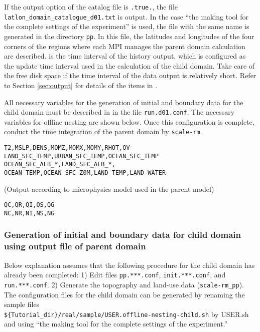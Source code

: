 If the output option of the catalog file is \verb|.true.|, the file \verb|latlon_domain_catalogue_d01.txt| is output. In the case ``the making tool for the complete settings of the experiment'' is used, the file with the same name is generated in the directory \verb|pp|. In this file, the latitudes and longitudes of the four corners of the regions where each MPI manages the parent domain calculation are described.  is the time interval of the history output,  which is configured as the update time interval used in the calculation of the child domain. Take care of the free disk space if the time interval of the data output is relatively short. Refer to Section \ref{sec:output} for details of the items in .

All necessary variables for the generation of initial and boundary data for the child domain must be described  in  in the file \verb|run.d01.conf|. The necessary variables for offline nesting are shown below. Once this configuration is complete, conduct the time integration of the parent domain by \verb|scale-rm|.
\begin{alltt}
  T2, MSLP, DENS, MOMZ, MOMX, MOMY, RHOT, QV
  LAND_SFC_TEMP, URBAN_SFC_TEMP, OCEAN_SFC_TEMP
  OCEAN_SFC_ALB_*, LAND_SFC_ALB_*,
  OCEAN_TEMP, OCEAN_SFC_Z0M, LAND_TEMP, LAND_WATER
\end{alltt}
(Output according to microphysics model used in the parent model)
\begin{alltt}
  QC, QR, QI, QS, QG
  NC, NR, NI, NS, NG
\end{alltt}

\subsubsection{Generation of initial and boundary data for child domain using output file of parent domain}

Below explanation assumes that the following procedure for the child domain has already been completed:
1) Edit files \verb|pp.***.conf|, \verb|init.***.conf|, and \verb|run.***.conf|.
2) Generate the topography and land-use data (\verb|scale-rm_pp|).
The configuration files for the child domain can be generated by renaming the sample files \\ \verb|${Tutorial_dir}/real/sample/USER.offline-nesting-child.sh| by USER.sh and using ``the making tool for the complete settings of the experiment.''

